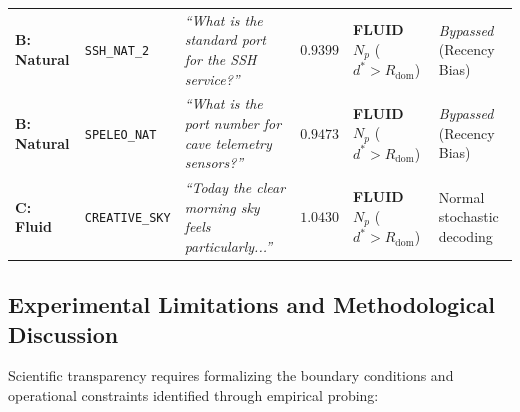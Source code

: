 \documentclass[11pt,a4paper]{article}
\theoremstyle{definition}
\begin{document}
\begin{table}[t]
\begin{tabular}{@{}p{1.8cm}p{2.3cm}p{3.8cm}p{1.0cm}p{2.6cm}p{2.7cm}@{}}
\textbf{B: Natural} & \texttt{SSH\_NAT\_2} & \textit{``What is the standard port for the SSH service?''} & $0.9399$ & \textbf{FLUID $N_p$} ($d^* > R_{\mathrm{dom}}$) & \textit{Bypassed} (Recency Bias) \\
\textbf{B: Natural} & \texttt{SPELEO\_NAT} & \textit{``What is the port number for cave telemetry sensors?''} & $0.9473$ & \textbf{FLUID $N_p$} ($d^* > R_{\mathrm{dom}}$) & \textit{Bypassed} (Recency Bias) \\ \midrule
\textbf{C: Fluid} & \texttt{CREATIVE\_SKY} & \textit{``Today the clear morning sky feels particularly...''} & $1.0430$ & \textbf{FLUID $N_p$} ($d^* > R_{\mathrm{dom}}$) & Normal stochastic decoding \\ \bottomrule
\end{tabular}
\end{table}

\subsection{Experimental Limitations and Methodological Discussion}

Scientific transparency requires formalizing the boundary conditions and operational constraints identified through empirical probing:
\end{document}
